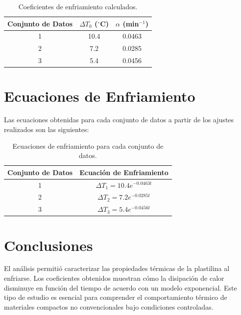 \documentclass[article,12pt]{elsarticle}
\begin{document}
\begin{table}[H]
\centering
\begin{tabular}{|c|c|c|}
\hline
\textbf{Conjunto de Datos} & \(\Delta T_0\) (\(^{\circ}\)C) & \(\alpha\) (min\(^{-1}\)) \\ \hline
1                          & 10.4                          & 0.0463                   \\ \hline
2                          & 7.2                           & 0.0285                   \\ \hline
3                          & 5.4                           & 0.0456                   \\ \hline
\end{tabular}
\caption{Coeficientes de enfriamiento calculados.}
\end{table}

\section*{Ecuaciones de Enfriamiento}

Las ecuaciones obtenidas para cada conjunto de datos a partir de los ajustes realizados son las siguientes:

\begin{table}[H]
\centering
\begin{tabular}{|c|c|}
\hline
\textbf{Conjunto de Datos} & \textbf{Ecuación de Enfriamiento}           \\ \hline
1                          & \(\Delta T_1 = 10.4 e^{-0.0463t}\)         \\ \hline
2                          & \(\Delta T_2 = 7.2 e^{-0.0285t}\)          \\ \hline
3                          & \(\Delta T_3 = 5.4 e^{-0.0456t}\)          \\ \hline
\end{tabular}
\caption{Ecuaciones de enfriamiento para cada conjunto de datos.}
\end{table}

\section*{Conclusiones}

El análisis permitió caracterizar las propiedades térmicas de la plastilina al enfriarse. Los coeficientes obtenidos muestran cómo la disipación de calor disminuye en función del tiempo de acuerdo con un modelo exponencial. Este tipo de estudio es esencial para comprender el comportamiento térmico de materiales compactos no convencionales bajo condiciones controladas.
\end{document}
